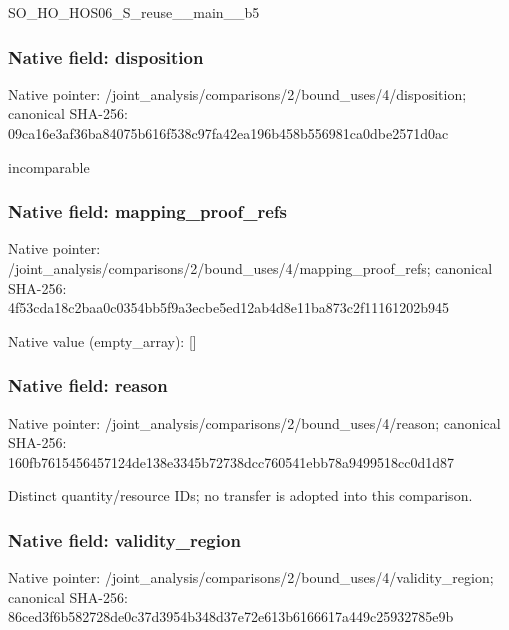 \documentclass[10pt,a4paper]{article}
\begin{document}
\begingroup\raggedright\sloppy SO\_\allowbreak{}HO\_\allowbreak{}HOS06\_\allowbreak{}S\_\allowbreak{}reuse\_\allowbreak{}\_\allowbreak{}main\_\allowbreak{}\_\allowbreak{}b5\par\endgroup

\subsubsection{Native field: disposition}
Native pointer: /joint\_\allowbreak{}analysis/comparisons/2/bound\_\allowbreak{}uses/4/disposition; canonical SHA-256: 09ca16e3af36ba84075b616f538c97fa42ea196b458b556981ca0dbe2571d0ac

\begingroup\raggedright\sloppy incomparable\par\endgroup

\subsubsection{Native field: mapping\_\allowbreak{}proof\_\allowbreak{}refs}
Native pointer: /joint\_\allowbreak{}analysis/comparisons/2/bound\_\allowbreak{}uses/4/mapping\_\allowbreak{}proof\_\allowbreak{}refs; canonical SHA-256: 4f53cda18c2baa0c0354bb5f9a3ecbe5ed12ab4d8e11ba873c2f11161202b945

Native value (empty\_\allowbreak{}array): []

\subsubsection{Native field: reason}
Native pointer: /joint\_\allowbreak{}analysis/comparisons/2/bound\_\allowbreak{}uses/4/reason; canonical SHA-256: 160fb7615456457124de138e3345b72738dcc760541ebb78a9499518cc0d1d87

\begingroup\raggedright\sloppy Distinct quantity/\allowbreak{}resource IDs;\allowbreak{} no transfer is adopted into this comparison.\par\endgroup

\subsubsection{Native field: validity\_\allowbreak{}region}
Native pointer: /joint\_\allowbreak{}analysis/comparisons/2/bound\_\allowbreak{}uses/4/validity\_\allowbreak{}region; canonical SHA-256: 86ced3f6b582728de0c37d3954b348d37e72e613b6166617a449c25932785e9b
\end{document}
